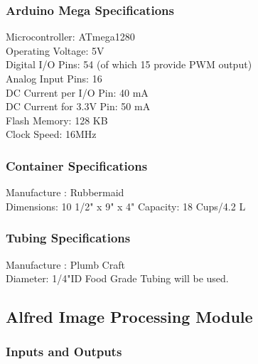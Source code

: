 \documentclass [10pt]{article}
\begin{document}
\subsubsection{Arduino Mega Specifications} 
Microcontroller:	ATmega1280\\
Operating Voltage:	5V\\
Digital I/O Pins: 54 (of which 15 provide PWM output)\\
Analog Input Pins: 16\\
DC Current per I/O Pin: 40 mA\\
DC Current for 3.3V Pin: 50 mA\\
Flash Memory: 128 KB\\
Clock Speed: 16MHz\\


\subsubsection{Container Specifications} 

Manufacture : Rubbermaid \\
Dimensions: 10 1/2" x 9" x 4" 
Capacity: 18 Cups/4.2 L\\


\subsubsection{Tubing Specifications}
Manufacture : Plumb Craft \\
Diameter: 1/4"ID Food Grade Tubing will be used.\\



\subsection{Alfred Image Processing Module }


\subsubsection{Inputs and Outputs}
\end{document}

